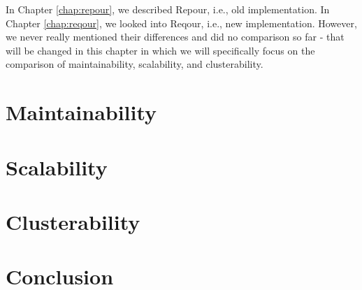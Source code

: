 \documentclass[../main.tex]{subfiles}
\begin{document}
In Chapter \ref{chap:repour}, we described Repour, i.e., old implementation. In Chapter \ref{chap:reqour}, we looked into Reqour, i.e., new implementation. However, we never really mentioned their differences and did no comparison so far ‐ that will be changed in this chapter in which we will specifically focus on the comparison of maintainability, scalability, and clusterability.

\section{Maintainability}


\section{Scalability}


\section{Clusterability}


\section*{Conclusion}

\end{document}
